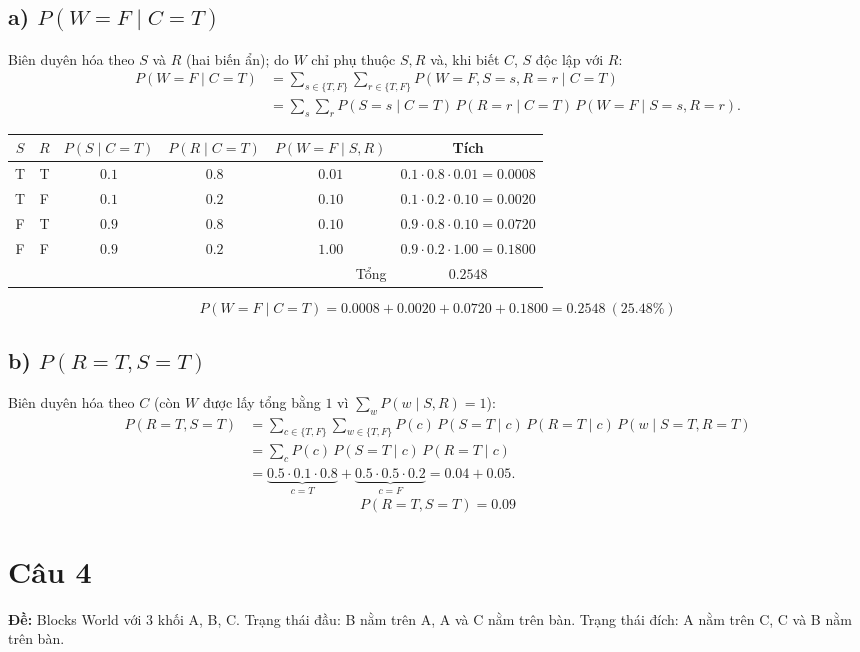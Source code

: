 \documentclass[a4paper,11pt]{article}
\newcommand{\cau}[1]{\section*{Câu #1}\addcontentsline{toc}{section}{Câu #1}}
\begin{document}
\subsection*{a) $P(W=F\mid C=T)$}
Biên duyên hóa theo $S$ và $R$ (hai biến ẩn); do $W$ chỉ phụ thuộc $S,R$ và, khi biết $C$, $S$ độc lập với $R$:
\begin{align*}
P(W{=}F\mid C{=}T)&=\sum_{s\in\{T,F\}}\sum_{r\in\{T,F\}}P(W{=}F,S{=}s,R{=}r\mid C{=}T)\\
&=\sum_{s}\sum_{r}P(S{=}s\mid C{=}T)\,P(R{=}r\mid C{=}T)\,P(W{=}F\mid S{=}s,R{=}r).
\end{align*}
\begin{center}
\begin{tabular}{cc|c|c|c|c}
\toprule
$S$ & $R$ & $P(S\mid C{=}T)$ & $P(R\mid C{=}T)$ & $P(W{=}F\mid S,R)$ & Tích \\
\midrule
T & T & $0.1$ & $0.8$ & $0.01$ & $0.1\cdot0.8\cdot0.01=0.0008$ \\
T & F & $0.1$ & $0.2$ & $0.10$ & $0.1\cdot0.2\cdot0.10=0.0020$ \\
F & T & $0.9$ & $0.8$ & $0.10$ & $0.9\cdot0.8\cdot0.10=0.0720$ \\
F & F & $0.9$ & $0.2$ & $1.00$ & $0.9\cdot0.2\cdot1.00=0.1800$ \\
\midrule
\multicolumn{5}{r|}{Tổng} & $\mathbf{0.2548}$ \\
\bottomrule
\end{tabular}
\end{center}
\[
\boxed{P(W=F\mid C=T)=0.0008+0.0020+0.0720+0.1800=0.2548\ (25.48\%)}
\]

\subsection*{b) $P(R=T,S=T)$}
Biên duyên hóa theo $C$ (còn $W$ được lấy tổng bằng $1$ vì $\sum_w P(w\mid S,R)=1$):
\begin{align*}
P(R{=}T,S{=}T)&=\sum_{c\in\{T,F\}}\sum_{w\in\{T,F\}}P(c)\,P(S{=}T\mid c)\,P(R{=}T\mid c)\,P(w\mid S{=}T,R{=}T)\\
&=\sum_{c}P(c)\,P(S{=}T\mid c)\,P(R{=}T\mid c)\\
&=\underbrace{0.5\cdot0.1\cdot0.8}_{c=T}+\underbrace{0.5\cdot0.5\cdot0.2}_{c=F}=0.04+0.05.
\end{align*}
\[
\boxed{P(R=T,S=T)=0.09}
\]

\clearpage
\cau{4}
\textbf{Đề:} Blocks World với $3$ khối A, B, C. Trạng thái đầu: B nằm trên A, A và C nằm trên bàn. Trạng thái đích: A nằm trên C, C và B nằm trên bàn.
\end{document}
